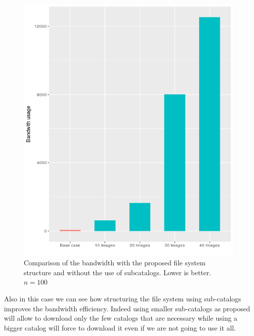 \begin{figure}[h]{}
    \includegraphics[scale=0.7]{gfx/bandwidth-catalog}
        \caption{Comparison of the bandwidth with the proposed file system structure and without the use of subcatalogs. Lower is better. $n=100$}
        \label{fig:bandwidth-usage}
\end{figure}


%
Also in this case we can see how structuring the file system using sub-catalogs
improves the bandwidth efficiency. Indeed using smaller sub-catalogs as
proposed will allow to download only the few catalogs that are necessary while
using a bigger catalog will force to download it even if we are not going to
use it all. 

